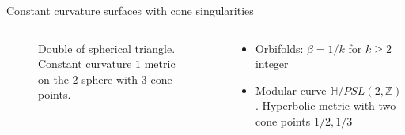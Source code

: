 \documentclass{beamer}
\begin{document}
\begin{frame}{Constant curvature surfaces with cone singularities}
\begin{columns}
\begin{column}{.48\textwidth}
\begin{figure}
{		
			}
			\caption{Double of spherical triangle.  Constant curvature \(1\) metric on the \(2\)-sphere with \(3\) cone points.}
		\end{figure}
	\end{column}
	\pause
	\begin{column}{.48\textwidth}
		\begin{itemize}
			\item Orbifolds: \(\beta = 1/k\) for \(k \geq 2\) integer
			\item Modular curve \(\mathbb{H}/PSL(2, \mathbb{Z})\). Hyperbolic metric with two cone points \(1/2, 1/3\)
		\end{itemize}
	\end{column}
\end{columns}
\end{frame}
\end{document}
